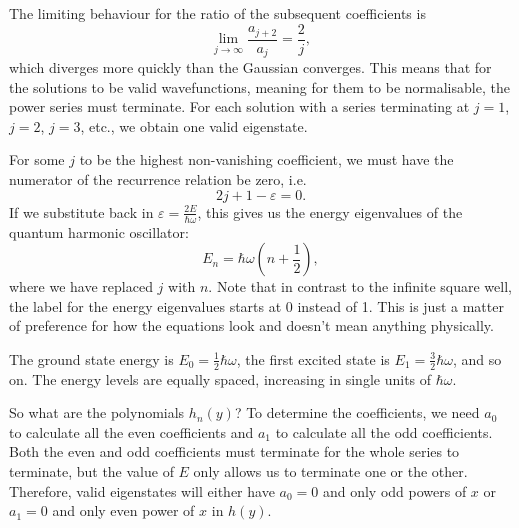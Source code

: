 \documentclass[../quantum_mechanics.tex]{subfiles}
\begin{document}
            The limiting behaviour for the ratio of the subsequent coefficients is
            \begin{equation}
                \lim_{j\to\infty}\frac{a_{j+2}}{a_j}=\frac{2}{j},
            \end{equation}
            which diverges more quickly than the Gaussian converges.
            This means that for the solutions to be valid wavefunctions, meaning for them to be normalisable, the power series must terminate.
            For each solution with a series terminating at $j=1$, $j=2$, $j=3$, etc., we obtain one valid eigenstate.

            For some $j$ to be the highest non-vanishing coefficient, we must have the numerator of the recurrence relation be zero, i.e.
            \begin{equation}
                2j+1-\varepsilon=0.
            \end{equation}
            If we substitute back in $\varepsilon=\frac{2E}{\hbar\omega}$, this gives us the energy eigenvalues of the quantum harmonic oscillator:
            \begin{equation}\label{eq:qho-eigenvalues}
                E_n=\hbar\omega\left(n+\frac{1}{2}\right),
            \end{equation}
            where we have replaced $j$ with $n$.
            Note that in contrast to the infinite square well, the label for the energy eigenvalues starts at 0 instead of 1.
            This is just a matter of preference for how the equations look and doesn't mean anything physically.

            The ground state energy is $E_0=\frac{1}{2}\hbar\omega$, the first excited state is $E_1=\frac{3}{2}\hbar\omega$, and so on.
            The energy levels are equally spaced, increasing in single units of $\hbar\omega$.

            So what are the polynomials $h_n(y)$?
            To determine the coefficients, we need $a_0$ to calculate all the even coefficients and $a_1$ to calculate all the odd coefficients.
            Both the even and odd coefficients must terminate for the whole series to terminate, but the value of $E$ only allows us to terminate one or the other.
            Therefore, valid eigenstates will either have $a_0=0$ and only odd powers of $x$ or $a_1=0$ and only even power of $x$ in $h(y)$.
\end{document}
